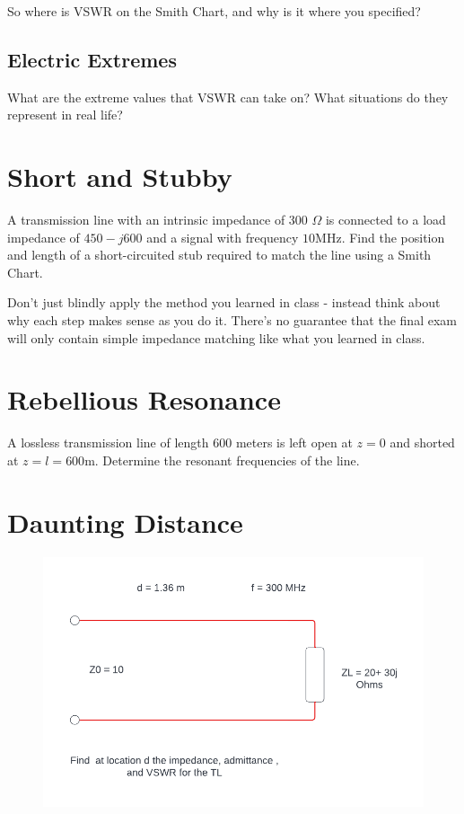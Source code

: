 \documentclass{article}
\begin{document}
So where is VSWR on the Smith Chart, and why is it where you specified?

\vspace{5cm}

\subsection{Electric Extremes}

What are the extreme values that VSWR can take on? What situations do they represent in real life?

\newpage

\section{Short and Stubby}

A transmission line with an intrinsic impedance of 300 $\Omega$ is connected to a load impedance of $450-j600$ and a signal with frequency $10$MHz. Find the position and length of a short-circuited stub required to match the line using a Smith Chart.

Don't just blindly apply the method you learned in class - instead think about why each step makes sense as you do it. There's no guarantee that the final exam will only contain simple impedance matching like what you learned in class.

\vfill

\section{Rebellious Resonance}

A lossless transmission line of length 600 meters is left open at $z = 0$ and shorted at $z = l = 600$m. Determine the resonant frequencies of the line.

\vfill

\newpage

\section{Daunting Distance}

\begin{figure}[H]
\begin{center}
    \includegraphics[width= 0.7
    \textwidth]{figures/VSWR Example.png}
\end{center}
\end{figure}
\end{document}

